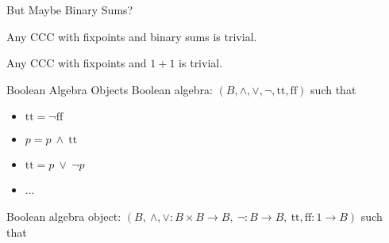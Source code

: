\documentclass{beamer}
\newcommand{\product}{\!\times\!}
\newcommand{\aand}{\ \wedge \ }
\newcommand{\oor}{\ \vee \ }
\newcommand{\true}{\text{tt}}
\newcommand{\false}{\text{ff}}
\newcommand{\arr}{\rightarrow}
\begin{document}
\begin{frame}[fragile]{But Maybe Binary Sums?}

\begin{theorem}
Any CCC with fixpoints and binary sums is trivial.
\end{theorem}

\begin{lemma}
Any CCC with fixpoints and $1+1$ is trivial.
\end{lemma}

\end{frame}



\begin{frame}[fragile]{Boolean Algebra Objects}
Boolean algebra: $(B,\wedge,\vee,\neg,\true,\false)$ such that
\begin{itemize}
\item $\true = \neg \false$
\item $p = p \aand \true$
\item $\true = p \oor \neg p$
\item ...
\end{itemize}

Boolean algebra object: $(B,\ \wedge, \vee : B\product B \arr B,\ \neg : B \arr B,\ \true, \false : 1 \arr B)$ such that

\begin{center}
\end{center}

\end{frame}
\end{document}
